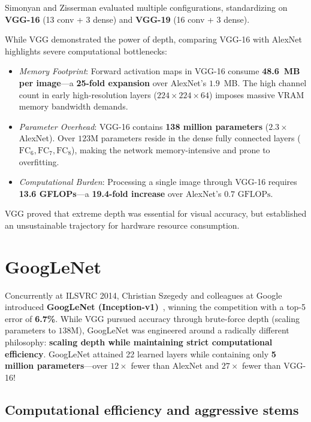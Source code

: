 Simonyan and Zisserman evaluated multiple configurations, standardizing on \textbf{VGG-16} (13 conv + 3 dense) and \textbf{VGG-19} (16 conv + 3 dense).

While VGG demonstrated the power of depth, comparing VGG-16 with AlexNet highlights severe computational bottlenecks:
\begin{itemize}[leftmargin=*]
  \item \textit{Memory Footprint}: Forward activation maps in VGG-16 consume \textbf{48.6~MB per image}---a \textbf{25-fold expansion} over AlexNet's $1.9$~MB. The high channel count in early high-resolution layers ($224 \times 224 \times 64$) imposes massive VRAM memory bandwidth demands.
  \item \textit{Parameter Overhead}: VGG-16 contains \textbf{138 million parameters} ($2.3\times$ AlexNet). Over $123\text{M}$ parameters reside in the dense fully connected layers ($\text{FC}_6, \text{FC}_7, \text{FC}_8$), making the network memory-intensive and prone to overfitting.
  \item \textit{Computational Burden}: Processing a single image through VGG-16 requires \textbf{13.6 GFLOPs}---a \textbf{19.4-fold increase} over AlexNet's $0.7\text{ GFLOPs}$.
\end{itemize}
VGG proved that extreme depth was essential for visual accuracy, but established an unsustainable trajectory for hardware resource consumption.

\section{GoogLeNet}
\label{sec:googlenet_model}

Concurrently at ILSVRC 2014, Christian Szegedy and colleagues at Google introduced \textbf{GoogLeNet (Inception-v1)}~\cite{szegedy2015going}, winning the competition with a top-5 error of \textbf{6.7\%}. While VGG pursued accuracy through brute-force depth (scaling parameters to $138\text{M}$), GoogLeNet was engineered around a radically different philosophy: \textbf{scaling depth while maintaining strict computational efficiency}. GoogLeNet attained 22 learned layers while containing only \textbf{5 million parameters}---over $12\times$ fewer than AlexNet and $27\times$ fewer than VGG-16!

\subsection{Computational efficiency and aggressive stems}
\label{sec:googlenet_aggressive_stem}

